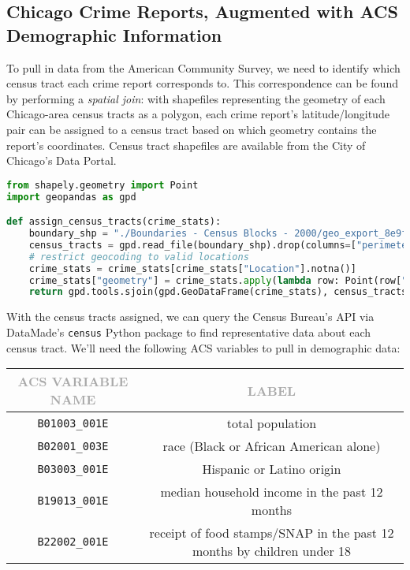 \documentclass[11pt]{article}
\newcommand{\printsubsection}[1]{\normalfont\headerfontlt\textcolor{darkgray}{{#1}}}
\newcommand{\opns}[1]{\textrm{\small\printsubsection{\MakeUppercase{#1}}}}
\begin{document}
\subsection{Chicago Crime Reports, Augmented with ACS Demographic Information}
To pull in data from the American Community Survey, we need to identify which census tract each crime report corresponds to. This correspondence can be found by performing a \textit{spatial join}: with shapefiles representing the geometry of each Chicago-area census tracts as a polygon, each crime report's latitude/longitude pair can be assigned to a census tract based on which geometry contains the report's coordinates. Census tract shapefiles are available from the City of Chicago's Data Portal.
\begin{lstlisting}[language=Python,numbers=none]
from shapely.geometry import Point
import geopandas as gpd

def assign_census_tracts(crime_stats):
    boundary_shp = "./Boundaries - Census Blocks - 2000/geo_export_8e9f6d85-3c5b-429f-b625-25afcc3dea85.shp"
    census_tracts = gpd.read_file(boundary_shp).drop(columns=["perimeter", "shape_area", "shape_len"])
    # restrict geocoding to valid locations
    crime_stats = crime_stats[crime_stats["Location"].notna()]
    crime_stats["geometry"] = crime_stats.apply(lambda row: Point(row["Longitude"], row["Latitude"]), axis = 1)
    return gpd.tools.sjoin(gpd.GeoDataFrame(crime_stats), census_tracts, how="inner")
\end{lstlisting}

With the census tracts assigned, we can query the Census Bureau's API via DataMade's \texttt{census} Python package to find representative data about each census tract. We'll need the following ACS variables to pull in demographic data:

\begin{table}[H]
\centering \renewcommand{\arraystretch}{1.2}
\begin{tabular}{c|c}
\opns{ACS VARIABLE NAME} & \opns{LABEL} \\\hline 
\texttt{B01003\_001E} & total population \\
\texttt{B02001\_003E} & race (Black or African American alone) \\
\texttt{B03003\_001E} & Hispanic or Latino origin \\
\texttt{B19013\_001E} & median household income in the past 12 months \\
\texttt{B22002\_001E} & receipt of food stamps/SNAP in the past 12 months by children under 18 
\end{tabular}
\end{table}
\end{document}

